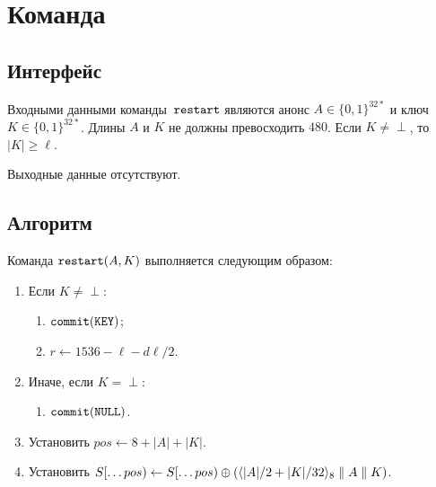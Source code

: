 \section{Команда }\label{PRG.Restart}

\subsection{Интерфейс}\label{PRG.Restart.IFace}

Входными данными команды~$\texttt{restart}$ являются анонс $A\in\{0,1\}^{32*}$ 
и ключ $K\in\{0,1\}^{32*}$. Длины $A$ и $K$ не должны превосходить $480$.
Если $K\neq\perp$, то~$|K|\geq\ell$.

Выходные данные отсутствуют.

\subsection{Алгоритм}\label{PRG.Restart.Alg}

Команда $\texttt{restart}(A,K)$ выполняется следующим образом:
\begin{enumerate}
\item
Если $K\neq\perp$:
\begin{enumerate}
\item
$\texttt{commit}(\texttt{KEY})$;
\item
$r\leftarrow 1536-\ell-d\ell/2$.
\end{enumerate}
\item
Иначе, если $K=\perp$:
\begin{enumerate}
\item
$\texttt{commit}(\texttt{NULL})$.
\end{enumerate}
\item
Установить
$pos\leftarrow 8+|A|+|K|$.
\item
Установить
$S[\dots pos)\leftarrow S[\dots pos)\oplus
\left(\langle|A|/2+|K|/32\rangle_8\parallel A\parallel K\right)$.
\end{enumerate}

